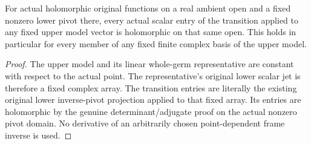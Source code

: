 \begin{theorem}
\label{hir:actual-jet-frame-truncation-holomorphic-entries}
For actual holomorphic original functions on a real ambient open and
a fixed nonzero lower pivot there, every actual scalar entry of the
transition applied to any fixed upper model vector is holomorphic
on that same open. This holds in particular for every member of any
fixed finite complex basis of the upper model.
\leanok
\end{theorem}
\begin{proof}
The upper model and its linear whole-germ representative are constant
with respect to the actual point. The representative's original
lower scalar jet is therefore a fixed complex array. The transition
entries are literally the existing original lower inverse-pivot
projection applied to that fixed array. Its entries are holomorphic
by the genuine determinant/adjugate proof on the actual nonzero
pivot domain. No derivative of an arbitrarily chosen point-dependent
frame inverse is used.
\end{proof}

